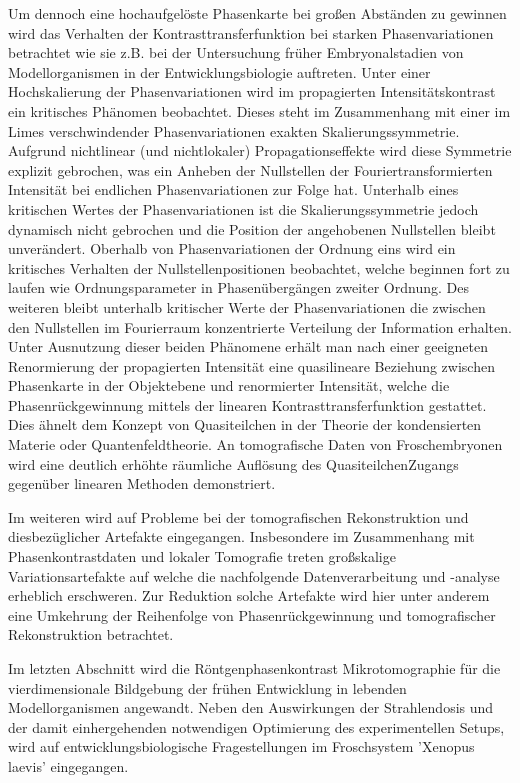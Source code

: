 \documentclass[
twoside,
openright,
titlepage,
numbers=noenddot,
headinclude,
fleqn,
a4paper,
footinclude=true,
cleardoublepage=empty,
abstractoff,
BCOR=5mm,
paper=a4,
fontsize=11pt,
british,ngerman,american,
]{scrreprt}
\begin{document}
Um dennoch eine hochaufgelöste Phasenkarte bei großen Abständen zu
gewinnen wird das Verhalten der Kontrasttransferfunktion bei starken
Phasenvariationen betrachtet wie sie z.B. bei der Untersuchung früher
Embryonalstadien von Modellorganismen in der Entwicklungsbiologie
auftreten.  Unter einer Hochskalierung der Phasenvariationen wird im
propagierten Intensitätskontrast ein kritisches Phänomen beobachtet.
Dieses steht im Zusammenhang mit einer im Limes verschwindender
Phasenvariationen exakten Skalierungssymmetrie.  Aufgrund nichtlinear
(und nichtlokaler) Propagationseffekte wird diese Symmetrie explizit
gebrochen, was ein Anheben der Nullstellen der Fouriertransformierten
Intensität bei endlichen Phasenvariationen zur Folge hat.  Unterhalb
eines kritischen Wertes der Pha\-sen\-va\-ri\-a\-tio\-nen ist die
Skalierungssymmetrie jedoch dynamisch nicht gebrochen und die Position
der angehobenen Nullstellen bleibt unverändert.  Oberhalb von
Phasenvariationen der Ordnung eins wird ein kritisches Verhalten der
Nullstellenpositionen beobachtet, welche beginnen fort zu laufen wie
Ordnungsparameter in Phasenübergängen zweiter Ordnung.  Des weiteren
bleibt unterhalb kritischer Werte der Phasenvariationen die zwischen
den Nullstellen im Fourierraum konzentrierte Verteilung der
Information erhalten.  Unter Ausnutzung dieser beiden Phänomene erhält
man nach einer geeigneten Re\-nor\-mier\-ung der propagierten
Intensität eine quasilineare Beziehung zwischen Phasenkarte in der
Objektebene und renormierter Intensität, welche die
Phasenrückgewinnung mittels der linearen Kontrasttransferfunktion
gestattet.  Dies ähnelt dem Konzept von Quasiteilchen in der Theorie
der kondensierten Materie oder Quantenfeldtheorie.  An tomografische
Daten von Froschembryonen wird eine deutlich erhöhte räumliche
Auflösung des Quasiteilchen\hyph Zugangs gegenüber linearen Methoden
demonstriert.

Im weiteren wird auf Probleme bei der tomografischen Rekonstruktion
und diesbezüglicher Artefakte eingegangen.  Insbesondere im
Zusammenhang mit Phasenkontrastdaten und lokaler Tomografie treten
großskalige Variationsartefakte auf welche die nachfolgende
Datenverarbeitung und -analyse erheblich erschweren.  Zur Reduktion
solche Artefakte wird hier unter anderem eine Umkehrung der
Reihenfolge von Phasenrückgewinnung und tomografischer Rekonstruktion
betrachtet.
 
Im letzten Abschnitt wird die Röntgenphasenkontrast\hyph
Mikrotomographie für die vierdimensionale Bildgebung der frühen
Entwicklung in lebenden Modellorganismen angewandt.  Neben den
Auswirkungen der Strahlendosis und der damit einhergehenden
notwendigen Optimierung des experimentellen Setups, wird auf
entwicklungsbiologische Fragestellungen im Froschsystem 'Xenopus
laevis' eingegangen.
\end{document}

